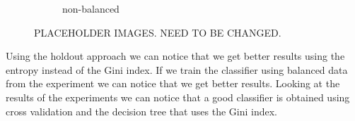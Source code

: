 \documentclass{article}
\begin{document}
\begin{figure}[H]
\begin{subfigure}{.5\textwidth}
		\caption{non-balanced}
	\end{subfigure}
	\caption{{\color{red} PLACEHOLDER IMAGES. NEED TO BE CHANGED.}}
\end{figure}


Using the holdout approach we can notice that we get better results using the entropy instead of the Gini index. If we train the classifier using balanced data from the experiment we can notice that we get better results. Looking at the results of the experiments we can notice that a good classifier is obtained using cross validation and the decision tree that uses the Gini index.





\clearpage
{}


\newpage

\appendix


\end{document}
